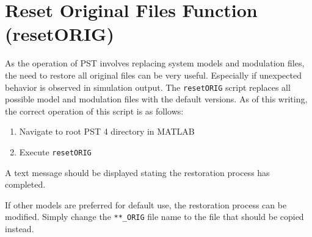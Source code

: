 \section{Reset Original Files Function (resetORIG)} 
As the operation of PST involves replacing system models and modulation files, the need to restore all original files can be very useful.
Especially if unexpected behavior is observed in simulation output.
The \verb|resetORIG| script replaces all possible model and modulation files with the default versions.
As of this writing, the correct operation of this script is as follows:
\begin{enumerate}
\item Navigate to root PST 4 directory in MATLAB
\item Execute \verb|resetORIG|
\end{enumerate}
A text message should be displayed stating the restoration process has completed.

If other models are preferred for default use, the restoration process can be modified.
Simply change the \verb|**_ORIG| file name to the file that should be copied instead.